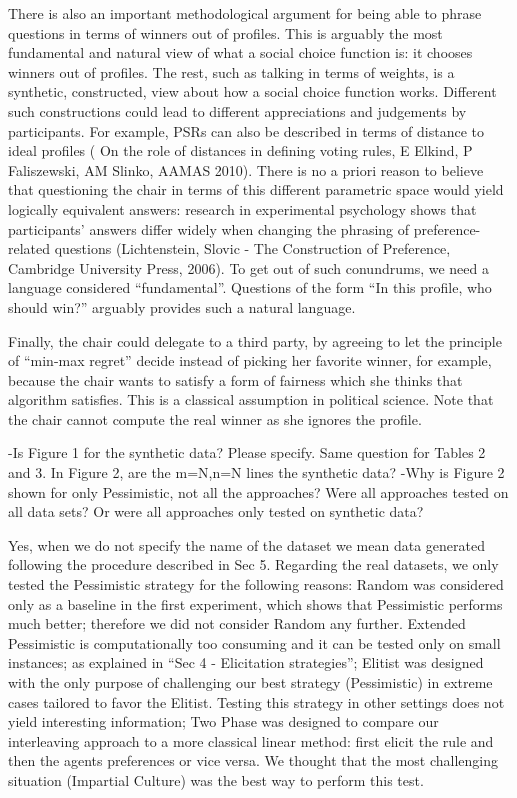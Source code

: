 \documentclass{article}
\begin{document}
There is also an important methodological argument for being able to phrase questions in terms of winners out of profiles. This is arguably the most fundamental and natural view of what a social choice function is: it chooses winners out of profiles. The rest, such as talking in terms of weights, is a synthetic, constructed, view about how a social choice function works. Different such constructions could lead to different appreciations and judgements by participants. For example, PSRs can also be described in terms of distance to ideal profiles ( On the role of distances in defining voting rules, E Elkind, P Faliszewski, AM Slinko, AAMAS 2010). There is no a priori reason to believe that questioning the chair in terms of this different parametric space would yield logically equivalent answers: research in experimental psychology shows that participants’ answers differ widely when changing the phrasing of preference-related questions (Lichtenstein, Slovic - The Construction of Preference, Cambridge University Press, 2006). To get out of such conundrums, we need a language considered “fundamental”. Questions of the form “In this profile, who should win?” arguably provides such a natural language.

Finally, the chair could delegate to a third party, by agreeing to let the principle of “min-max regret” decide instead of picking her favorite winner, for example, because the chair wants to satisfy a form of fairness which she thinks that algorithm satisfies. This is a classical assumption in political science. Note that the chair cannot compute the real winner as she ignores the profile. 

-Is Figure 1 for the synthetic data? Please specify. Same question for Tables 2 and 3. In Figure 2, are the m=N,n=N lines the synthetic data?
-Why is Figure 2 shown for only Pessimistic, not all the approaches? Were all approaches tested on all data sets? Or were all approaches only tested on synthetic data?

Yes, when we do not specify the name of the dataset we mean data generated following the procedure described in Sec 5. Regarding the real datasets, we only tested the Pessimistic strategy for the following reasons:
Random was considered only as a baseline in the first experiment, which shows that Pessimistic performs much better; therefore we did not consider Random any further. 
Extended Pessimistic is computationally too consuming and it can be tested only on small instances; as explained in “Sec 4 - Elicitation strategies”; 
Elitist was designed with the only purpose of challenging our best strategy (Pessimistic) in extreme cases tailored to favor the Elitist. Testing this strategy in other settings does not yield interesting information;
Two Phase was designed to compare our interleaving approach to a more classical linear method: first elicit the rule and then the agents preferences or vice versa. We thought that the most challenging situation (Impartial Culture) was the best way to perform this test.
\end{document}
